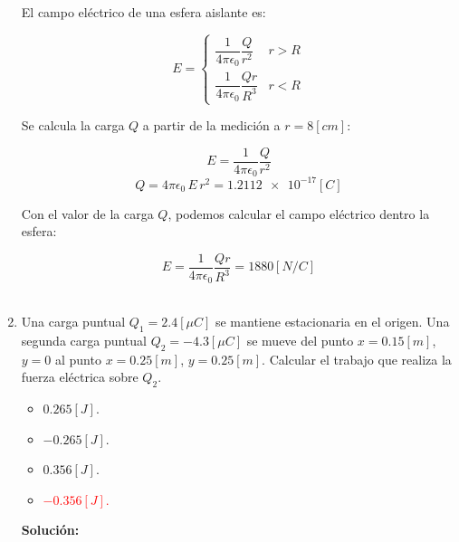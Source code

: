 \documentclass[letter,11pt]{article}
\begin{document}
\begin{enumerate}
El campo eléctrico de una esfera aislante es:

\begin{equation*}
    E = \begin{cases}
        \dfrac{1}{4\pi\epsilon_0}\dfrac{Q}{r^2} & r > R \\
        \dfrac{1}{4\pi\epsilon_0}\dfrac{Q r}{R^3} & r < R
    \end{cases}
\end{equation*}

Se calcula la carga $Q$ a partir de la medición a $r = 8 [cm]$:

\begin{equation*}
    E = \frac{1}{4\pi\epsilon_0}\frac{Q}{r^2}
\end{equation*}
\begin{equation*}
    Q = 4\pi\epsilon_0\,E\,r^2 = \num{1.2112e-17} [C]
\end{equation*}

Con el valor de la carga $Q$, podemos calcular el campo eléctrico dentro la 
esfera:

\begin{equation*}
    E = \frac{1}{4\pi\epsilon_0}\frac{Q r}{R^3} =  1880 [N/C]
\end{equation*}
\\

\item Una carga puntual $Q_1 = 2.4 [\mu C]$ se mantiene estacionaria en el
origen. Una segunda carga puntual $Q_2 = -4.3 [\mu C]$ se mueve del punto
$x = 0.15 [m]$, $y = 0$ al punto $x = 0.25 [m]$, $y = 0.25 [m]$. Calcular el
trabajo que realiza la fuerza eléctrica sobre $Q_2$.

\begin{itemize}
    \item $ 0.265 [J]$.
    \item $-0.265 [J]$.
    \item $ 0.356 [J]$.
    \item \textcolor{red}{$-0.356 [J]$.}
\end{itemize}

\textbf{Solución:}


\end{enumerate}
\end{document}
